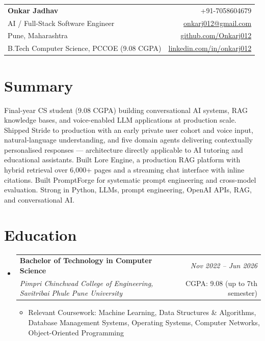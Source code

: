\documentclass[a4paper,11pt]{article}
\makeatletter
\newcommand{\resumeSubheading}[4]{
\vspace{0.5mm}\item
    \begin{tabular*}{0.98\textwidth}[t]{l@{\extracolsep{\fill}}r}
        \textbf{#1} & \textit{\footnotesize{#4}} \\
        \textit{\footnotesize{#3}} & \footnotesize{#2}\\
    \end{tabular*}
    \vspace{-2.4mm}
}
\newcommand{\resumeSubHeadingListStart}{\begin{itemize}[leftmargin=*,labelsep=0mm]}
\newcommand{\resumeItemListStart}{\begin{justify}\begin{itemize}[leftmargin=3ex, rightmargin=2ex, noitemsep,labelsep=1.2mm,itemsep=0mm]\small}
\newcommand{\resumeSubHeadingListEnd}{\end{itemize}\vspace{2mm}}
\newcommand{\resumeItemListEnd}{\end{itemize}\end{justify}\vspace{-2mm}}
\newcommand{\name}{Onkar Jadhav}
\newcommand{\phone}{7058604679}
\newcommand{\emaila}{onkarj012@gmail.com}
\newcommand{\github}{github.com/Onkarj012}
\newcommand{\linkedin}{linkedin.com/in/onkarj012}
\makeatother
\begin{document}
\begin{tabularx}{\linewidth}{L r}
  \textbf{\Large \name} & {+91-\phone} \\
  {AI / Full-Stack Software Engineer} & \href{mailto:\emaila}{\emaila} \\
  {Pune, Maharashtra} & \href{https://\github}{\github} \\
  {B.Tech Computer Science, PCCOE (9.08 CGPA)} & \href{https://\linkedin}{\linkedin}
\end{tabularx}
\vspace{-4mm}

\section{\textbf{Summary}}
\vspace{1mm}
\small{
Final-year CS student (9.08 CGPA) building conversational AI systems, RAG knowledge bases, and voice-enabled LLM applications at production scale. Shipped Stride to production with an early private user cohort and voice input, natural-language understanding, and five domain agents delivering contextually personalised responses --- architecture directly applicable to AI tutoring and educational assistants. Built Lore Engine, a production RAG platform with hybrid retrieval over 6,000+ pages and a streaming chat interface with inline citations. Built PromptForge for systematic prompt engineering and cross-model evaluation. Strong in Python, LLMs, prompt engineering, OpenAI APIs, RAG, and conversational AI.
}
\vspace{-3mm}

\section{\textbf{Education}}
  \resumeSubHeadingListStart
    \resumeSubheading
      {Bachelor of Technology in Computer Science}{CGPA: 9.08 (up to 7th semester)}
      {Pimpri Chinchwad College of Engineering, Savitribai Phule Pune University}{Nov 2022 -- Jun 2026}
      \resumeItemListStart
        \item {Relevant Coursework: Machine Learning, Data Structures \& Algorithms, Database Management Systems, Operating Systems, Computer Networks, Object-Oriented Programming}
      \resumeItemListEnd
  \resumeSubHeadingListEnd
\vspace{-5.5mm}

\end{document}
